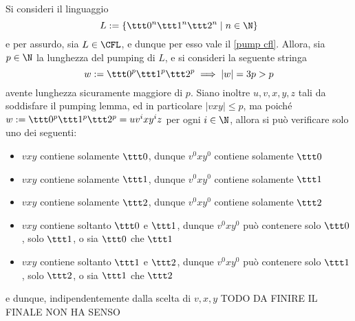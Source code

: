 \documentclass[a4paper, 12pt]{report}
\begin{document}

    \begin{example}
        \label{pump cfl ex1}
        Si consideri il linguaggio $$L := \{\ttt 0 ^n \ttt 1 ^n \ttt 2 ^n \mid n \in \N\}$$ e per assurdo, sia $L \in \mathrm{\CFL}$, e dunque per esso vale il \cref{pump cfl}. Allora, sia $p \in \N$ la lunghezza del pumping di $L$, e si consideri la seguente stringa $$w:=\ttt 0^p \ttt 1^p \ttt 2 ^p \implies |w| = 3p > p$$ avente lunghezza sicuramente maggiore di $p$. Siano inoltre $u, v, x, y, z$ tali da soddisfare il pumping lemma, ed in particolare $|vxy| \le p$, ma poiché $w := \ttt 0^p \ttt 1 ^p \ttt 2^p = uv^ixy^iz$ per ogni $i \in \N$, allora si può verificare solo uno dei seguenti:

        \begin{itemize}
            \item $vxy$ contiene solamente $\ttt 0$, dunque $v^0xy^0$ contiene solamente $\ttt 0$
            \item $vxy$ contiene solamente $\ttt 1$, dunque $v^0xy^0$ contiene solamente $\ttt 1$
            \item $vxy$ contiene solamente $\ttt 2$, dunque $v^0xy^0$ contiene solamente $\ttt 2$
            \item $vxy$ contiene soltanto $\ttt 0$ e $\ttt 1$, dunque $v^0xy^0$ può contenere solo $\ttt 0$, solo $\ttt 1$, o sia $\ttt 0$ che $\ttt 1$
            \item $vxy$ contiene soltanto $\ttt 1$ e $\ttt 2$, dunque $v^0xy^0$ può contenere solo $\ttt 1$, solo $\ttt 2$, o sia $\ttt 1$ che $\ttt 2$
        \end{itemize}
        
        e dunque, indipendentemente dalla scelta di $v, x, y$ TODO DA FINIRE IL FINALE NON HA SENSO
    \end{example}
\end{document}
